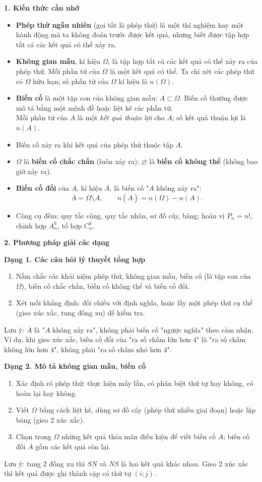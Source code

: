 \textbf{1. Kiến thức cần nhớ}
\begin{itemize}
\item \textbf{Phép thử ngẫu nhiên} (gọi tắt là phép thử) là một thí nghiệm hay một hành động mà ta không đoán trước được kết quả, nhưng biết được tập hợp tất cả các kết quả có thể xảy ra.
\item \textbf{Không gian mẫu}, kí hiệu $\Omega$, là tập hợp tất cả các kết quả có thể xảy ra của phép thử. Mỗi phần tử của $\Omega$ là một kết quả có thể. Ta chỉ xét các phép thử có $\Omega$ hữu hạn; số phần tử của $\Omega$ kí hiệu là $n(\Omega)$.
\item \textbf{Biến cố} là một tập con của không gian mẫu: $A\subset\Omega$. Biến cố thường được mô tả bằng một mệnh đề hoặc liệt kê các phần tử.\\
Mỗi phần tử của $A$ là một \emph{kết quả thuận lợi} cho $A$; số kết quả thuận lợi là $n(A)$.
\item Biến cố xảy ra khi kết quả của phép thử thuộc tập $A$.
\item $\Omega$ là \textbf{biến cố chắc chắn} (luôn xảy ra); $\varnothing$ là \textbf{biến cố không thể} (không bao giờ xảy ra).
\item \textbf{Biến cố đối} của $A$, kí hiệu $\overline{A}$, là biến cố "$A$ không xảy ra":
\[ \boxed{\overline{A}=\Omega\setminus A},\qquad \boxed{n\left(\overline{A}\right)=n(\Omega)-n(A)}. \]
\item Công cụ đếm: quy tắc cộng, quy tắc nhân, sơ đồ cây, bảng; hoán vị $P_n=n!$, chỉnh hợp $A_n^k$, tổ hợp $C_n^k$.
\end{itemize}

\textbf{2. Phương pháp giải các dạng}

\textbf{Dạng 1. Các câu hỏi lý thuyết tổng hợp}
\begin{enumerate}
\item Nắm chắc các khái niệm phép thử, không gian mẫu, biến cố (là tập con của $\Omega$), biến cố chắc chắn, biến cố không thể và biến cố đối.
\item Xét mỗi khẳng định: đối chiếu với định nghĩa, hoặc lấy một phép thử cụ thể (gieo xúc xắc, tung đồng xu) để kiểm tra.
\end{enumerate}
Lưu ý: $\overline{A}$ là "$A$ không xảy ra", không phải biến cố "ngược nghĩa" theo cảm nhận. Ví dụ, khi gieo xúc xắc, biến cố đối của "ra số chấm lớn hơn $4$" là "ra số chấm không lớn hơn $4$", không phải "ra số chấm nhỏ hơn $4$".

\textbf{Dạng 2. Mô tả không gian mẫu, biến cố}
\begin{enumerate}
\item Xác định rõ phép thử: thực hiện mấy lần, có phân biệt thứ tự hay không, có hoàn lại hay không.
\item Viết $\Omega$ bằng cách liệt kê, dùng sơ đồ cây (phép thử nhiều giai đoạn) hoặc lập bảng (gieo $2$ xúc xắc).
\item Chọn trong $\Omega$ những kết quả thỏa mãn điều kiện để viết biến cố $A$; biến cố đối $\overline{A}$ gồm các kết quả còn lại.
\end{enumerate}
Lưu ý: tung $2$ đồng xu thì $SN$ và $NS$ là hai kết quả khác nhau. Gieo $2$ xúc xắc thì kết quả được ghi thành cặp có thứ tự $(i;j)$.

